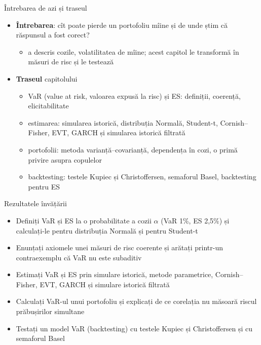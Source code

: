 \begin{frame}{Întrebarea de azi și traseul}
\itemsize{\small}
\begin{itemize}
    \item \textbf{Întrebarea}: cît poate pierde un portofoliu mîine și de unde știm că răspunsul a fost corect?
    \begin{itemize}
        \item {} a descris cozile,  volatilitatea de mîine; acest capitol le transformă în măsuri de risc și le testează
    \end{itemize}
    \item \textbf{Traseul} capitolului
    \begin{itemize}
        \item VaR (value at risk, valoarea expusă la risc) și ES: definiții, coerență, elicitabilitate
        \item estimarea: simularea istorică, distribuția Normală, Student-t, Cornish--Fisher, EVT, GARCH și simularea istorică filtrată
        \item portofolii: metoda varianță--covarianță, dependența în cozi, o primă privire asupra copulelor
        \item backtesting: testele Kupiec și Christoffersen, semaforul Basel, backtesting pentru ES
    \end{itemize}
\end{itemize}
\end{frame}

\begin{frame}{Rezultatele învățării}
\itemsize{\small}
\begin{itemize}
    \item Definiți VaR și ES la o probabilitate a cozii $\alpha$ (VaR 1\%, ES 2,5\%) și calculați-le pentru distribuția Normală și pentru Student-t
    \item Enunțați axiomele unei măsuri de risc coerente și arătați printr-un contraexemplu că VaR nu este subaditiv
    \item Estimați VaR și ES prin simulare istorică, metode parametrice, Cornish--Fisher, EVT, GARCH și simulare istorică filtrată
    \item Calculați VaR-ul unui portofoliu și explicați de ce corelația nu măsoară riscul prăbușirilor simultane
    \item Testați un model VaR (backtesting) cu testele Kupiec și Christoffersen și cu semaforul Basel
\end{itemize}
\end{frame}

